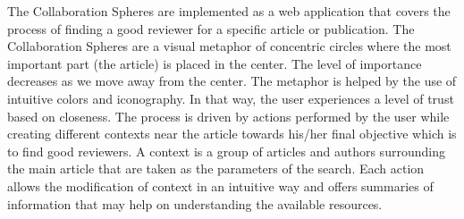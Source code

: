 The Collaboration Spheres are implemented as a web application that covers the process
of finding a good reviewer for a specific article or publication. The Collaboration Spheres are a visual metaphor of concentric circles where the most important part (the article) is placed in the center. The level of importance decreases as we move away from the center. The metaphor is helped by the use of intuitive colors and iconography. In that way, the user experiences a level of trust based on closeness. The process is driven by actions performed by the user while creating different contexts near the article towards his/her final objective which is to find good reviewers. A context is a group of articles and authors surrounding the main article that are taken as the parameters of the search. Each action allows the modification of context in an intuitive way and offers summaries of information that may help on understanding the available resources.\\
